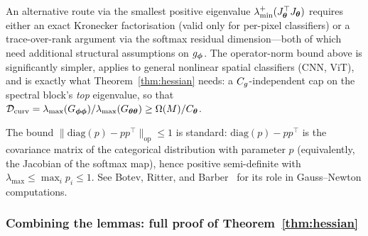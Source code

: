\begin{remark}
An alternative route via the smallest positive eigenvalue
$\lambda_{\min}^{+}(J_{\boldsymbol{\theta}}^\top J_{\boldsymbol{\theta}})$ requires either an
exact Kronecker factorisation (valid only for per-pixel classifiers)
or a trace-over-rank argument via the softmax residual
dimension---both of which need additional structural assumptions on
$g_{\boldsymbol{\phi}}$. The operator-norm bound above is significantly simpler,
applies to general nonlinear spatial classifiers (CNN, ViT), and is
exactly what Theorem~\ref{thm:hessian} needs: a $C_g$-independent
cap on the spectral block's \emph{top} eigenvalue, so that
$\mathcal{D}_{\mathrm{curv}} = \lambda_{\max}(G_{{\boldsymbol{\phi}}{\boldsymbol{\phi}}})
/\lambda_{\max}(G_{{\boldsymbol{\theta}}{\boldsymbol{\theta}}}) \geq
\Omega(M)/C_{\boldsymbol{\theta}}$.
\end{remark}

\begin{remark}
The bound $\|\mathrm{diag}(p) - p p^\top\|_{\mathrm{op}} \leq 1$ is
standard: $\mathrm{diag}(p) - p p^\top$ is the covariance matrix of
the categorical distribution with parameter $p$ (equivalently, the
Jacobian of the softmax map), hence positive semi-definite with
$\lambda_{\max} \leq \max_i p_i \leq 1$. See Botev, Ritter, and
Barber~\cite{botev2017practical} for its role in Gauss--Newton
computations.
\end{remark}

\subsubsection{Combining the lemmas: full proof of Theorem~\ref{thm:hessian}}
\label{sec:thm1_combine}

